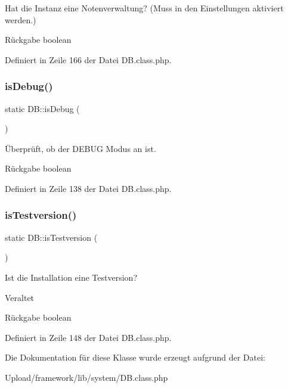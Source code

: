 Hat die Instanz eine Notenverwaltung? (Muss in den Einstellungen aktiviert werden.) \begin{DoxyReturn}{Rückgabe}
boolean 
\end{DoxyReturn}


Definiert in Zeile 166 der Datei D\+B.\+class.\+php.

\mbox{\label{class_d_b_a88339147447cac62cd91dbfe2cc4a852}} 
\subsubsection{\texorpdfstring{is\+Debug()}{isDebug()}}
{\footnotesize\ttfamily static D\+B\+::is\+Debug (\begin{DoxyParamCaption}{ }\end{DoxyParamCaption})\hspace{0.3cm}{\ttfamily [static]}}

Überprüft, ob der D\+E\+B\+UG Modus an ist. \begin{DoxyReturn}{Rückgabe}
boolean 
\end{DoxyReturn}


Definiert in Zeile 138 der Datei D\+B.\+class.\+php.

\mbox{\label{class_d_b_af81dc9b99fb7289bfd817cc0b91b5e0d}} 
\subsubsection{\texorpdfstring{is\+Testversion()}{isTestversion()}}
{\footnotesize\ttfamily static D\+B\+::is\+Testversion (\begin{DoxyParamCaption}{ }\end{DoxyParamCaption})\hspace{0.3cm}{\ttfamily [static]}}

Ist die Installation eine Testversion? \begin{DoxyRefDesc}{Veraltet}
\item[\mbox{\hyperlink{deprecated__deprecated000043}{Veraltet}}]\end{DoxyRefDesc}
\begin{DoxyReturn}{Rückgabe}
boolean 
\end{DoxyReturn}


Definiert in Zeile 148 der Datei D\+B.\+class.\+php.



Die Dokumentation für diese Klasse wurde erzeugt aufgrund der Datei\+:\begin{DoxyCompactItemize}
\item 
Upload/framework/lib/system/D\+B.\+class.\+php\end{DoxyCompactItemize}
